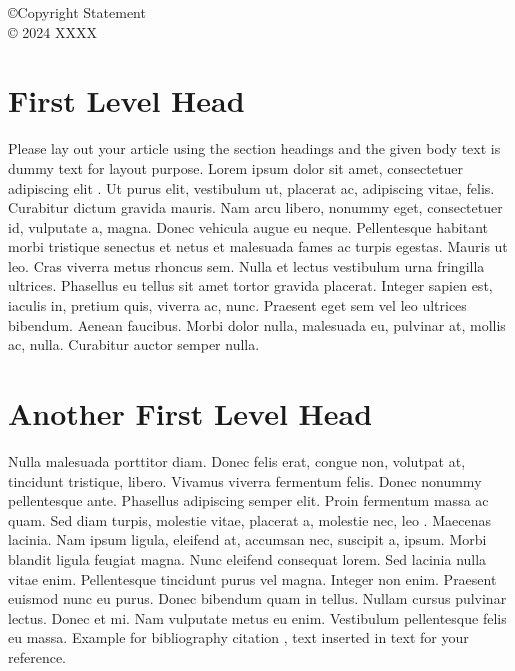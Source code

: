 \documentclass[ASNA,twocolumn]{USG} %
\begin{document}



\copyright{Copyright Statement
\\[5pt]
  ©  2024 XXXX}


\maketitle


\section{First Level Head}\label{sec1}

Please lay out your article using the section headings and the given body text is dummy text for layout purpose.
Lorem ipsum dolor sit amet, consectetuer adipiscing elit \cite{Hoch2009}. Ut purus elit, vestibulum ut, placerat ac, adipiscing vitae,
felis. Curabitur dictum gravida mauris. Nam arcu libero, nonummy eget, consectetuer id, vulputate a, magna. Donec
vehicula augue eu neque. Pellentesque habitant morbi tristique senectus et netus et malesuada fames ac turpis egestas.
Mauris ut leo. Cras viverra metus rhoncus sem. Nulla et lectus vestibulum urna fringilla ultrices. Phasellus eu tellus
sit amet tortor gravida placerat. Integer sapien est, iaculis in, pretium quis, viverra ac, nunc. Praesent eget sem vel
leo ultrices bibendum. Aenean faucibus. Morbi dolor nulla, malesuada eu, pulvinar at, mollis ac, nulla. Curabitur
auctor semper nulla.
 
 \section{Another First Level Head}\label{sec2}

Nulla malesuada porttitor diam. Donec felis erat, congue non, volutpat at, tincidunt tristique, libero. Vivamus viverra
fermentum felis. Donec nonummy pellentesque ante. Phasellus adipiscing semper elit. Proin fermentum massa ac
quam. Sed diam turpis, molestie vitae, placerat a, molestie nec, leo \cite{Margolin2003}. Maecenas lacinia. Nam ipsum ligula, eleifend
at, accumsan nec, suscipit a, ipsum. Morbi blandit ligula feugiat magna. Nunc eleifend consequat lorem. Sed lacinia
nulla vitae enim. Pellentesque tincidunt purus vel magna. Integer non enim. Praesent euismod nunc eu purus. Donec
bibendum quam in tellus. Nullam cursus pulvinar lectus. Donec et mi. Nam vulputate metus eu enim. Vestibulum
pellentesque felis eu massa. Example for bibliography citation \cite{Kenamond2013}, text \cite{Knupp1999,Kamm2000} inserted in text for your reference.
\end{document}
